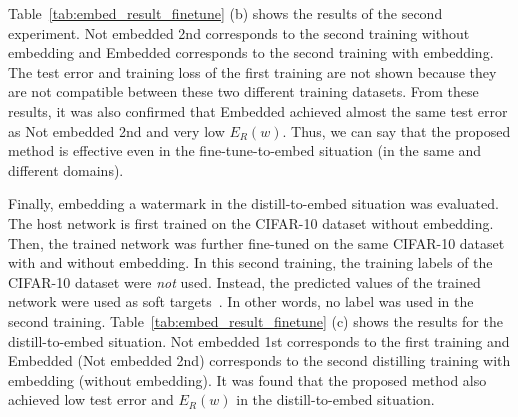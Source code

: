\documentclass[10pt,twocolumn,letterpaper]{article}
\begin{document}
Table~\ref{tab:embed_result_finetune} (b) shows the results of the second experiment.
\textsf{Not embedded 2nd} corresponds to the second training without embedding and \textsf{Embedded} corresponds to the second training with embedding.
The test error and training loss of the first training are not shown because they are not compatible between these two different training datasets.
From these results, it was also confirmed that \textsf{Embedded} achieved almost the same test error as \textsf{Not embedded 2nd} and very low $E_R (w)$.
Thus, we can say that the proposed method is effective even in the fine-tune-to-embed situation (in the same and different domains).

Finally, embedding a watermark in the distill-to-embed situation was evaluated.
The host network is first trained on the CIFAR-10 dataset without embedding.
Then, the trained network was further fine-tuned on the same CIFAR-10 dataset with and without embedding.
In this second training, the training labels of the CIFAR-10 dataset were \textit{not} used.
Instead, the predicted values of the trained network were used as soft targets~\cite{hin_nipsw14}.
In other words, no label was used in the second training.
Table~\ref{tab:embed_result_finetune} (c) shows the results for the distill-to-embed situation.
\textsf{Not embedded 1st} corresponds to the first training and \textsf{Embedded} (\textsf{Not embedded 2nd}) corresponds to the second distilling training with embedding (without embedding).
It was found that the proposed method also achieved low test error and $E_R (w)$ in the distill-to-embed situation.
\end{document}

